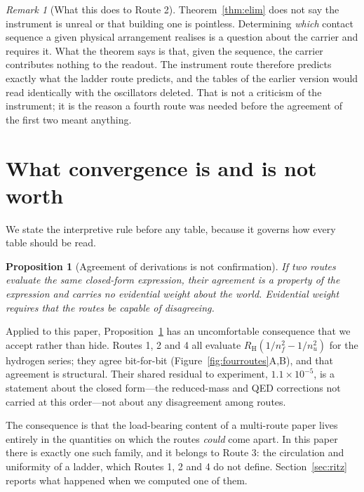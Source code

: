 \documentclass[11pt,a4paper]{article}
\theoremstyle{stmtstyle}
\newtheorem{proposition}{Proposition}
\theoremstyle{definition}
\theoremstyle{remark}
\newtheorem*{remark}{Remark}
\begin{document}
\begin{remark}[What this does to Route 2]
\label{rem:route2}
Theorem~\ref{thm:elim} does not say the instrument is unreal or that
building one is pointless. Determining \emph{which} contact sequence a
given physical arrangement realises is a question about the carrier and
requires it. What the theorem says is that, given the sequence, the carrier
contributes nothing to the readout. The instrument route therefore predicts
exactly what the ladder route predicts, and the tables of the earlier
version would read identically with the oscillators deleted. That is not a
criticism of the instrument; it is the reason a fourth route was needed
before the agreement of the first two meant anything.
\end{remark}

\section{What convergence is and is not worth}
\label{sec:convergence-worth}

We state the interpretive rule before any table, because it governs how
every table should be read.

\begin{proposition}[Agreement of derivations is not confirmation]
\label{prop:agreement}
If two routes evaluate the same closed-form expression, their agreement is
a property of the expression and carries no evidential weight about the
world. Evidential weight requires that the routes be capable of
disagreeing.
\end{proposition}

Applied to this paper, Proposition~\ref{prop:agreement} has an uncomfortable
consequence that we accept rather than hide. Routes 1, 2 and 4 all evaluate
$R_{\mathrm H}(1/n_f^{2}-1/n_u^{2})$ for the hydrogen series; they agree
bit-for-bit (Figure~\ref{fig:fourroutes}A,B), and that agreement is
structural. Their shared residual to experiment, $1.1\times10^{-5}$, is a
statement about the closed form---the reduced-mass and QED corrections not
carried at this order---not about any disagreement among routes.

The consequence is that the load-bearing content of a multi-route paper
lives entirely in the quantities on which the routes \emph{could} come
apart. In this paper there is exactly one such family, and it belongs to
Route 3: the circulation and uniformity of a ladder, which Routes 1, 2 and
4 do not define. Section~\ref{sec:ritz} reports what happened when we
computed one of them.
\end{document}
